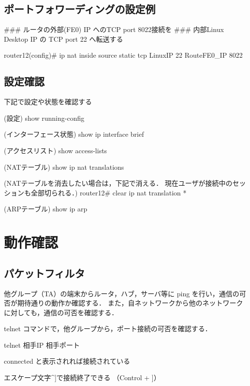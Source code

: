 \subsection{ポートフォワーディングの設定例}

\begin{cli}

### ルータの外部(FE0) IP へのTCP port 8022接続を
### 内部Linux Desktop IP の TCP port 22 へ転送する

router12(config)# ip nat inside source static tcp LinuxIP 22 RouteFE0_IP 8022
\end{cli}

\subsection{設定確認}

\begin{cli}

下記で設定や状態を確認する

(設定)
show running-config

(インターフェース状態)
show ip interface brief

(アクセスリスト)
show access-lists

(NATテーブル)
show ip nat translations

(NATテーブルを消去したい場合は，下記で消える．
 現在ユーザが接続中のセッションも全部切られる．)
router12# clear ip nat translation *

(ARPテーブル)
show ip arp

\end{cli}


\section{動作確認}

\subsection*{パケットフィルタ}

他グループ（TA）の端末からルータ，ハブ，サーバ等に ping を行い，通信の可否が期待通りの動作か確認する．
また，自ネットワークから他のネットワークに対しても，通信の可否を確認する．

telnet コマンドで，他グループから，ポート接続の可否を確認する．

\begin{cli}
telnet 相手IP 相手ポート

connected と表示されれば接続されている

エスケープ文字^]で接続終了できる
（Control + ]）
\end{cli}

